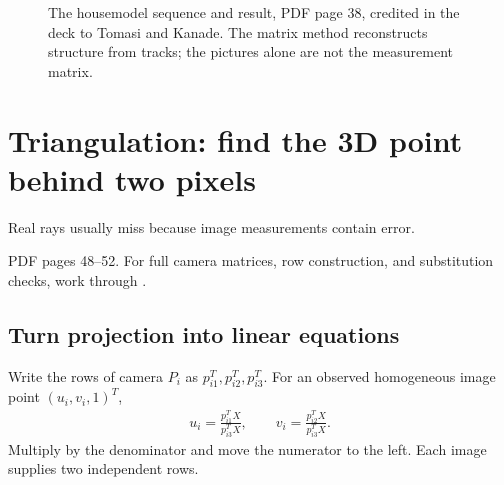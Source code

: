 \documentclass[letterpaper,11pt,english,openany,oneside]{jupyterBook}
\begin{document}
\begin{figure}[H]
\centering
\capstart

\noindent{}
\caption{The house\sphinxhyphen{}model sequence and result, PDF page 38, credited in the deck to Tomasi and Kanade. The matrix method reconstructs structure from tracks; the pictures alone are not the measurement matrix.}\label{\detokenize{lectures/lecture06/factorization:fig-lec06-factorization-house}}\end{figure}

\ignorespaces
{}\ignorespaces
\sphinxstepscope


\section{Triangulation: find the 3D point behind two pixels}
\label{\detokenize{lectures/lecture06/triangulation:triangulation-find-the-3d-point-behind-two-pixels}}\label{\detokenize{lectures/lecture06/triangulation:lec06-triangulation}}\label{\detokenize{lectures/lecture06/triangulation::doc}}
\sphinxAtStartPar
{} Real rays usually miss because image measurements contain error.

\sphinxAtStartPar
{} PDF pages 48–52. For full camera matrices, row construction, and substitution checks, work through {\hyperref[\detokenize{lectures/lecture06/quiz-workbook:quiz-a5-q1}]{}}.


\subsection{Turn projection into linear equations}
\label{\detokenize{lectures/lecture06/triangulation:turn-projection-into-linear-equations}}
\sphinxAtStartPar
Write the rows of camera \(P_i\) as \(p_{i1}^T,p_{i2}^T,p_{i3}^T\). For an observed homogeneous image point \((u_i,v_i,1)^T\),
\begin{equation*}
\begin{split}u_i=\frac{p_{i1}^TX}{p_{i3}^TX},\qquad v_i=\frac{p_{i2}^TX}{p_{i3}^TX}.\end{split}
\end{equation*}
\sphinxAtStartPar
Multiply by the denominator and move the numerator to the left. Each image supplies two independent rows.
\end{document}
